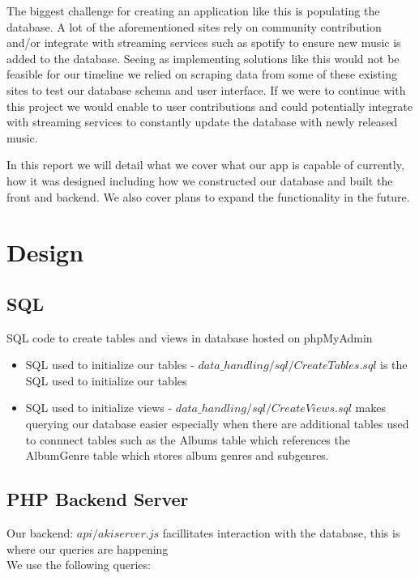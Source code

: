 \documentclass{article}
\begin{document}
The biggest challenge for creating an application like this is populating the database. 
A lot of the aforementioned sites rely on community contribution and/or integrate with streaming services such as spotify to ensure new music is added to the database. 
Seeing as implementing solutions like this would not be feasible for our timeline we relied on scraping data from some of these existing sites to test our database schema 
and user interface. If we were to continue with this project we would enable to user contributions and could potentially integrate with streaming services to constantly 
update the database with newly released music.

In this report we will detail what we cover what our app is capable of currently, how it was designed including how we constructed our database and built the front and backend. 
We also cover plans to expand the functionality in the future.

\pagebreak


\section{Design}
    \subsection{SQL} SQL code to create tables and views in database hosted on phpMyAdmin
    \begin{itemize}
        \item SQL used to initialize our tables 
        - $data\_handling/sql/CreateTables.sql$ is the SQL used to initialize our tables
        \item SQL used to initialize views 
        - $data\_handling/sql/CreateViews.sql$ makes querying our database easier especially when there are additional tables
        used to connnect tables such as the Albums table which references the AlbumGenre table which stores album genres and subgenres.
    \end{itemize}

    \subsection{PHP Backend Server} Our backend: $api/akiserver.js$ facillitates interaction with the database, this is where our queries are happening \\ 
    We use the following queries:
\end{document}
